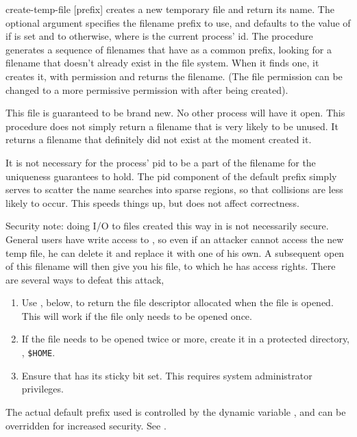 \begin{defundesc}  {create-temp-file}  {[prefix]}         \str
     creates a new temporary file and return its name.
    The optional argument specifies the filename prefix to use, and defaults
    to the value of  if \TMPDIR{} is set and to
     otherwise, where  is the current process' id.
    The procedure generates a sequence of filenames that have  as
    a common prefix, looking for a filename that doesn't already exist in the
    file system. When it finds one, it creates it, with permission 
    and returns the filename. (The file permission can be changed to a more
    permissive permission with  after being created).

    This file is guaranteed to be brand new. No other process will have it
    open. This procedure does not simply return a filename that is very
    likely to be unused. It returns a filename that definitely did not exist
    at the moment  created it.

    It is not necessary for the process' pid to be a part of the filename
    for the uniqueness guarantees to hold. The pid component of the default
    prefix simply serves to scatter the name searches into sparse regions, so
    that collisions are less likely to occur. This speeds things up, but does
    not affect correctness.

    Security note: doing I/O to files created this way in  is
    not necessarily secure. General users have write access to ,
    so even if an attacker cannot access the new temp file, he can delete it
    and replace it with one of his own. A subsequent open of this filename
    will then give you his file, to which he has access rights. There are
    several ways to defeat this attack,
    \begin{enumerate}
        \item Use , below, to return the file descriptor
           allocated when the file is opened. This will work if the file
           only needs to be opened once.
        \item If the file needs to be opened twice or more, create it in a 
           protected directory, \eg, \verb|$HOME|.
        \item Ensure that  has its sticky bit set. This
           requires system administrator privileges.
    \end{enumerate}
    The actual default prefix used is controlled by the dynamic variable
    , and can be overridden for increased security.
    See .
\end{defundesc}

